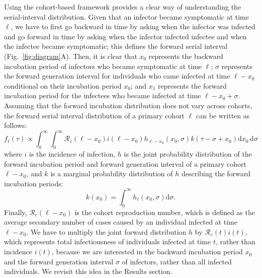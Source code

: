 \documentclass[12pt]{article}
\newcommand{\fref}[1]{Fig.~\ref{fig:#1}}
\begin{document}
Using the cohort-based framework provides a clear way of understanding the serial-interval distribution.
Given that an infector became symptomatic at time $\ell$, we have to first go backward in time by asking when the infector was infected and go forward in time by asking when the infector infected infectee and when the infectee became symptomatic;
this defines the forward serial interval (\fref{diagram}A).
Then, it is clear that $x_0$ represents the backward incubation period of infectors who became symptomatic at time $\ell$; 
$\sigma$ represents the forward generation interval for individuals who came infected at time $\ell - x_0$ conditional on their incubation period $x_0$;
and $x_1$ represents the forward incubation period for the infectees who became infected at time $\ell - x_0 + \sigma$.
Assuming that the forward incubation distribution does not vary across cohorts, the forward serial interval distribution of a primary cohort $\ell$ can be written as follows:
\begin{equation}
f_\ell(\tau) \propto \int_{0}^\infty \int_{0}^\infty \mathcal R_c (\ell - x_0) i(\ell - x_0) h_{\ell - x_0}(x_0, \sigma) k(\tau-\sigma+x_0) \mathrm{d} x_0\, \mathrm{d}\sigma
\end{equation}
where $i$ is the incidence of infection, $h$ is the joint probability distribution of the forward incubation period and forward generation interval of a primary cohort $\ell - x_0$, and $k$ is a marginal probability distribution of $h$ describing the forward incubation periods:
\begin{equation}
k(x_0) = \int_0^\infty h_\ell(x_0, \sigma) \mathrm{d}\sigma.
\end{equation}
Finally, $\mathcal R_c (\ell - x_0)$ is the cohort reproduction number, which is defined as the average secondary number of cases caused by an individual infected at time $\ell - x_0$.
We have to multiply the joint forward distribution $h$ by $\mathcal R_c (t) i(t)$, which represents total infectiousness of individuals infected at time $t$, rather than incidence $i(t)$, because we are interested in the backward incubation period $x_0$ and the forward generation interval $\sigma$ of infectors, rather than all infected individuals.
We revisit this idea in the Results section.
\end{document}
